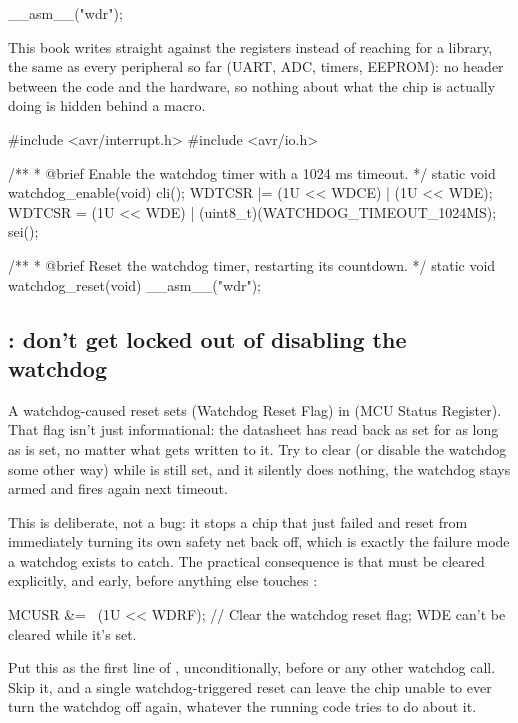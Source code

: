 \begin{ccode}
__asm__("wdr");
\end{ccode}

\noindent This book writes straight against the registers instead of reaching for a library, the
same as every peripheral so far (UART, ADC, timers, EEPROM): no header between the code and the
hardware, so nothing about what the chip is actually doing is hidden behind a macro.

\begin{ccode}
#include <avr/interrupt.h>
#include <avr/io.h>

/**
 * @brief Enable the watchdog timer with a 1024 ms timeout.
 */
static void watchdog_enable(void)
{
    cli();
    WDTCSR |= (1U << WDCE) | (1U << WDE);
    WDTCSR = (1U << WDE) | (uint8_t)(WATCHDOG_TIMEOUT_1024MS);
    sei();
}

/**
 * @brief Reset the watchdog timer, restarting its countdown.
 */
static void watchdog_reset(void)
{
    __asm__("wdr");
}
\end{ccode}

\subsection{: don't get locked out of disabling the watchdog}
\label{c8:a:3}
A watchdog-caused reset sets  (Watchdog Reset Flag) in \textbf{} (MCU Status
Register). That flag isn't just informational: the datasheet has  read back as set for as
long as  is set, no matter what gets written to it. Try to clear  (or disable
the watchdog some other way) while  is still set, and it silently does nothing, the
watchdog stays armed and fires again next timeout.

This is deliberate, not a bug: it stops a chip that just failed and reset from immediately turning
its own safety net back off, which is exactly the failure mode a watchdog exists to catch. The
practical consequence is that  must be cleared explicitly, and early, before anything
else touches :

\begin{ccode}
MCUSR &= ~(1U << WDRF); // Clear the watchdog reset flag; WDE can't be cleared while it's set.
\end{ccode}

\noindent Put this as the first line of , unconditionally, before
 or any other watchdog call. Skip it, and a single watchdog-triggered reset
can leave the chip unable to ever turn the watchdog off again, whatever the running code tries to
do about it.

